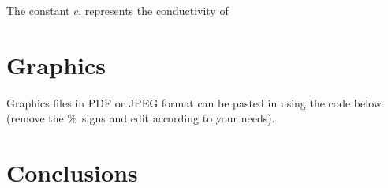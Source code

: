 \documentclass[12pt]{article}  %
\begin{document}
The constant $c$, represents the conductivity of   
\section{Graphics}

Graphics files in PDF or JPEG format can be pasted in using the code
below (remove the \%\ signs and edit according to your needs).

\begin{center}
%
%
%
%
%
\end{center}

\section{Conclusions}\label{s:conc}



%
%
%
\end{document}
